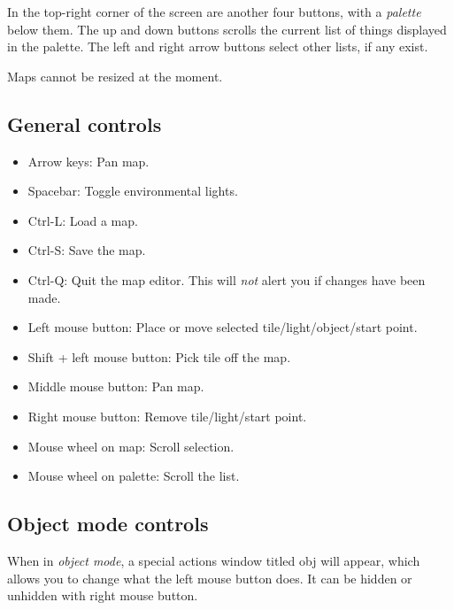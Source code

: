 \documentclass[a4paper]{article}
\begin{document}
In the top-right corner of the screen are another four buttons, with a
\emph{palette} below them.  The \textsf{up} and \textsf{down} buttons
scrolls the current list of things displayed in the palette.  The left
and right arrow buttons select other lists, if any exist.

Maps cannot be resized at the moment.


\subsection{General controls}

\begin{itemize}

\item Arrow keys: Pan map.

\item Spacebar: Toggle environmental lights.

\item Ctrl-L: Load a map.

\item Ctrl-S: Save the map.

\item Ctrl-Q: Quit the map editor.  This will \emph{not} alert you if
  changes have been made.

\item Left mouse button: Place or move selected
  tile/light/object/start point.

\item Shift + left mouse button: Pick tile off the map.

\item Middle mouse button: Pan map.

\item Right mouse button: Remove tile/light/start point.

\item Mouse wheel on map: Scroll selection.

\item Mouse wheel on palette: Scroll the list.

\end{itemize}


\subsection{Object mode controls}

When in \emph{object mode}, a special actions window titled
\textsf{obj} will appear, which allows you to change what the left
mouse button does.  It can be hidden or unhidden with right mouse
button.
\end{document}
